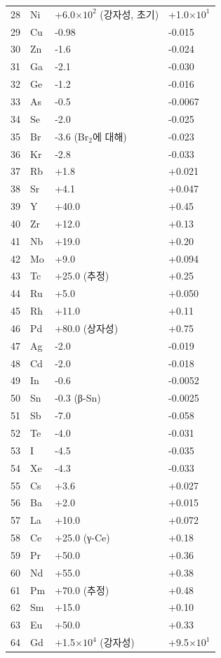 \documentclass[12pt,a4paper]{article}
\begin{document}
\begin{longtable}{p{0.6cm}p{1.2cm}p{2.5cm}p{2.5cm}}
		28 & Ni & +6.0\(\times10^2\) (강자성, 초기) & +1.0\(\times10^1\) \\
		29 & Cu & -0.98 & -0.015 \\
		30 & Zn & -1.6 & -0.024 \\
		31 & Ga & -2.1 & -0.030 \\
		32 & Ge & -1.2 & -0.016 \\
		33 & As & -0.5 & -0.0067 \\
		34 & Se & -2.0 & -0.025 \\
		35 & Br & -3.6 (Br\(_2\)에 대해) & -0.023 \\
		36 & Kr & -2.8 & -0.033 \\
		37 & Rb & +1.8 & +0.021 \\
		38 & Sr & +4.1 & +0.047 \\
		39 & Y  & +40.0 & +0.45 \\
		40 & Zr & +12.0 & +0.13 \\
		41 & Nb & +19.0 & +0.20 \\
		42 & Mo & +9.0 & +0.094 \\
		43 & Tc & +25.0 (추정) & +0.25 \\
		44 & Ru & +5.0 & +0.050 \\
		45 & Rh & +11.0 & +0.11 \\
		46 & Pd & +80.0 (상자성) & +0.75 \\
		47 & Ag & -2.0 & -0.019 \\
		48 & Cd & -2.0 & -0.018 \\
		49 & In & -0.6 & -0.0052 \\
		50 & Sn & -0.3 (β-Sn) & -0.0025 \\
		51 & Sb & -7.0 & -0.058 \\
		52 & Te & -4.0 & -0.031 \\
		53 & I  & -4.5 & -0.035 \\
		54 & Xe & -4.3 & -0.033 \\
		55 & Cs & +3.6 & +0.027 \\
		56 & Ba & +2.0 & +0.015 \\
		57 & La & +10.0 & +0.072 \\
		58 & Ce & +25.0 (γ-Ce) & +0.18 \\
		59 & Pr & +50.0 & +0.36 \\
		60 & Nd & +55.0 & +0.38 \\
		61 & Pm & +70.0 (추정) & +0.48 \\
		62 & Sm & +15.0 & +0.10 \\
		63 & Eu & +50.0 & +0.33 \\
		64 & Gd & +1.5\(\times10^4\) (강자성) & +9.5\(\times10^1\) \\

\end{longtable}
\end{document}
